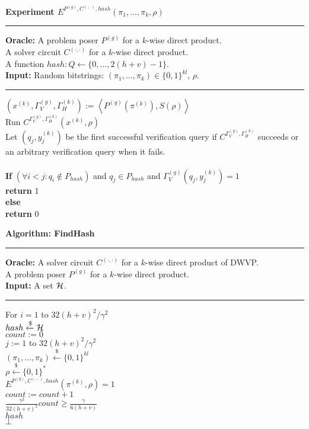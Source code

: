 %
%
\begin{codeblock}
  \textbf{Experiment $E^{P^{(g)}, C^{(\cdot, \cdot)}, hash}(\pi_1, \dots, \pi_k, \rho)$}
  \medskip

  \hrule

  \medskip
  \textbf{Oracle:} A problem poser $P^{(g)}$ for a $k$-wise direct product. \\
  \IndI A solver circuit $C^{(\cdot, \cdot)}$ for a $k$-wise direct product. \\
  \IndI A function $hash: Q \leftarrow \{0, \dots, 2(h+v) - 1\}$.\\
  \textbf{Input:} Random bitstrings: $(\pi_1, \dots, \pi_k) \in \{0,1\}^{kl}$, $\rho$.
  \medskip\hrule\medskip
  $(x^{(k)}, \Gamma_V^{(g)}, \Gamma_H^{(k)}) := \left\langle P^{(g)}(\pi^{(k)}), S(\rho) \right\rangle$\\
  Run $C^{\Gamma_V^{(g)}, \Gamma_H^{(k)}} (x^{(k)}, \rho)$ \\
  \IndI Let $(q_j,y_j^{(k)})$ be the first successful verification query if $C^{\Gamma_V^{(g)}, \Gamma_H^{(k)}}$ succeeds or \\
  \IndI an arbitrary verification query when it fails.\\
  \\
  \textbf{If} $(\forall i < j :  q_i \notin P_{hash} )$ and $q_j \in P_{hash}$ and $\Gamma_V^{(g)}(q_j, y_j^{(k)}) = 1$ \\
  \IndI \textbf{return} 1\\
  \textbf{else}\\
  \IndI \textbf{return} 0
\end{codeblock}
%
\begin{codeblock}
  \textbf{Algorithm: FindHash}
  \medskip
  \hrule
  \medskip

  \textbf{Oracle:} A solver circuit $C^{(\cdot, \cdot)}$ for a $k$-wise direct product of DWVP. \\
  \IndII A problem poser $P^{(g)}$ for a $k$-wise direct product. \\
  \textbf{Input:} A set $\mathcal{H}$.
  \medskip\hrule\medskip
  For $i = 1$ to $32(h+v)^2/\gamma^2$ \\
  \IndI $hash \xleftarrow{\$} \mathcal{H}$ \\
  \IndI $count := 0$ \\
  \IndI \For $j := 1$ to $32(h+v)^2/\gamma^2$ \\
  \IndII $(\pi_1, \dots, \pi_k) \xleftarrow{\$} \{0,1\}^{kl} $\\
  \IndII $\rho \xleftarrow{\$} \{0,1\}^{*} $\\
  \IndII \If $E^{P^{(g)}, C^{(\cdot, \cdot)}, hash}(\pi^{(k)}, \rho) = 1$ \then \\
  \IndIII $count := count + 1$\\
  \IndI \If $\frac{\gamma^2}{32(h+v)^2} count \geq \frac{\gamma}{6(h+v)}$ \\
  \IndII \return $hash$\\
  \return $\bot$
\end{codeblock}
